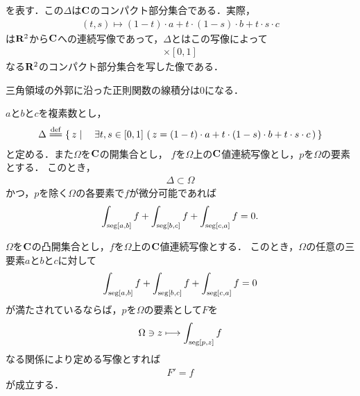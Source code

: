 	を表す．この$\Delta$は$\mathbf{C}$のコンパクト部分集合である．実際，
	\begin{align}
		(t,s) \longmapsto (1-t) \cdot a + t \cdot (1-s) \cdot b + t \cdot s \cdot c
	\end{align}
	は$\mathbf{R}^2$から$\mathbf{C}$への連続写像であって，$\Delta$とはこの写像によって
	\begin{align}
		[0,1] \times [0,1]
	\end{align}
	なる$\mathbf{R}^2$のコンパクト部分集合を写した像である．
	
	三角領域の外郭に沿った正則関数の線積分は$0$になる．
	
	\begin{screen}
		\begin{thm}\label{Cauchy_Goursat_theorem}
			$a$と$b$と$c$を複素数とし，
			\begin{align}
				\Delta \defeq \Set{z}{\exists t,s \in [0,1]\, 
				\left(\, z = (1-t) \cdot a 
				+ t \cdot (1-s) \cdot b 
				+ t \cdot s \cdot c\, \right)}
			\end{align}
			と定める．また$\Omega$を$\mathbf{C}$の開集合とし，
			$f$を$\Omega$上の$\mathbf{C}$値連続写像とし，$p$を$\Omega$の要素とする．
			このとき，
			\begin{align}
				\Delta \subset \Omega
			\end{align}
			かつ，$p$を除く$\Omega$の各要素で$f$が微分可能であれば
			\begin{align}
				\int_{\operatorname{seg}[a,b]} f + \int_{\operatorname{seg}[b,c]} f + \int_{\operatorname{seg}[c,a]} f = 0.
			\end{align}
		\end{thm}
	\end{screen}
	
	\begin{screen}
		\begin{thm}
		\label{thm:a_holomorphic_function_is_derivative_of_some_holomorphic_function_on_convex_open}
			$\Omega$を$\mathbf{C}$の凸開集合とし，$f$を$\Omega$上の$\mathbf{C}$値連続写像とする．
			このとき，$\Omega$の任意の三要素$a$と$b$と$c$に対して
			\begin{align}
				\int_{\operatorname{seg}[a,b]} f + \int_{\operatorname{seg}[b,c]} f + \int_{\operatorname{seg}[c,a]} f = 0
			\end{align}
			が満たされているならば，$p$を$\Omega$の要素として$F$を
			\begin{align}
				\Omega \ni z \longmapsto \int_{\operatorname{seg}[p,z]} f
			\end{align}
			なる関係により定める写像とすれば
			\begin{align}
				F' = f
			\end{align}
			が成立する．
		\end{thm}
	\end{screen}
	
